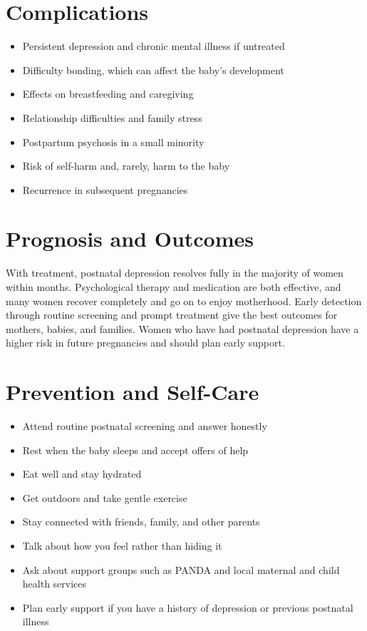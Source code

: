 \section*{Complications}
\begin{itemize}
    \item Persistent depression and chronic mental illness if untreated
    \item Difficulty bonding, which can affect the baby's development
    \item Effects on breastfeeding and caregiving
    \item Relationship difficulties and family stress
    \item Postpartum psychosis in a small minority
    \item Risk of self-harm and, rarely, harm to the baby
    \item Recurrence in subsequent pregnancies
\end{itemize}

\section*{Prognosis and Outcomes}
With treatment, postnatal depression resolves fully in the majority of women within months. Psychological therapy and medication are both effective, and many women recover completely and go on to enjoy motherhood. Early detection through routine screening and prompt treatment give the best outcomes for mothers, babies, and families. Women who have had postnatal depression have a higher risk in future pregnancies and should plan early support.

\section*{Prevention and Self-Care}
\begin{itemize}
    \item Attend routine postnatal screening and answer honestly
    \item Rest when the baby sleeps and accept offers of help
    \item Eat well and stay hydrated
    \item Get outdoors and take gentle exercise
    \item Stay connected with friends, family, and other parents
    \item Talk about how you feel rather than hiding it
    \item Ask about support groups such as PANDA and local maternal and child health services
    \item Plan early support if you have a history of depression or previous postnatal illness
\end{itemize}

